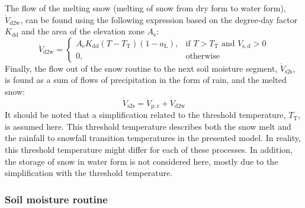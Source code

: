 \documentclass[%
]{USN-PhD}
\begin{document}
The flow of the melting snow (melting of snow from dry form to water form), $\dot{V}_\mathrm{d2w}$, can be found using the following expression based on the degree-day factor $K_\mathrm{dd}$ and the area of the elevation zone $A_\mathrm{e}$:
\begin{equation}\label{eq:eq23}
\dot{V}_\mathrm{d2w}=\begin{cases} A_\mathrm{e}K_\mathrm{dd}(T - T_\mathrm{T})(1 - a_\mathrm{L}), & \mbox{if }T>T_\mathrm{T}\mbox{ and }V_\mathrm{s,d}>0\\ 0, & \mbox{otherwise} \end{cases}
\end{equation}
Finally, the flow out of the snow routine to the next soil moisture segment, $\dot{V}_\mathrm{s2s}$, is found as a sum of flows of precipitation in the form of rain, and the melted snow:
\begin{equation}\label{eq:eq24}
\dot{V}_\mathrm{s2s}=\dot{V}_\mathrm{p,r}+\dot{V}_\mathrm{d2w}
\end{equation}
It should be noted that a simplification related to the threshold temperature, $T_\mathrm{T}$, is assumed here. This threshold temperature describes both the snow melt and the rainfall to snowfall transition temperatures in the presented model. In reality, this threshold temperature might differ for each of these processes. In addition, the storage of snow in water form is not considered here, mostly due to the simplification with the threshold temperature.

\subsubsection{Soil moisture routine}
\end{document}
